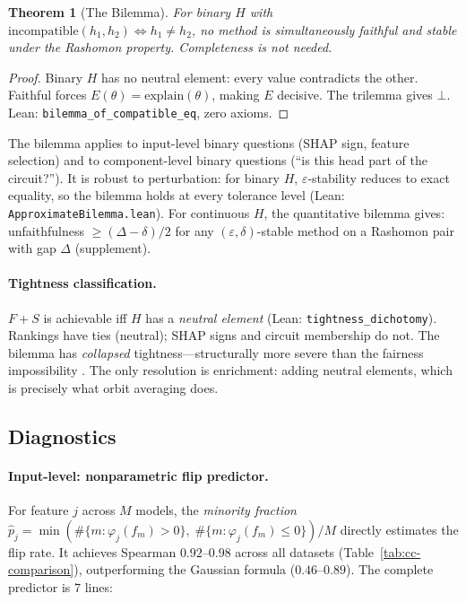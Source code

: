 \documentclass{article}
\newtheorem{theorem}{Theorem}
\begin{document}
\begin{theorem}[The Bilemma]
\label{thm:bilemma}
For binary $H$ with $\mathrm{incompatible}(h_1, h_2) \Leftrightarrow h_1 \neq h_2$, no method is simultaneously faithful and stable under the Rashomon property. Completeness is not needed.
\end{theorem}
\begin{proof}
Binary $H$ has no neutral element: every value contradicts the other. Faithful forces $E(\theta) = \mathrm{explain}(\theta)$, making $E$ decisive. The trilemma gives $\bot$. \hfill Lean: \texttt{bilemma\_of\_compatible\_eq}, zero axioms.
\end{proof}

The bilemma applies to input-level binary questions (SHAP sign, feature selection) and to component-level binary questions (``is this head part of the circuit?''). It is robust to perturbation: for binary $H$, $\varepsilon$-stability reduces to exact equality, so the bilemma holds at every tolerance level (Lean: \texttt{ApproximateBilemma.lean}). For continuous $H$, the quantitative bilemma gives: unfaithfulness $\geq (\Delta - \delta)/2$ for any $(\varepsilon,\delta)$-stable method on a Rashomon pair with gap $\Delta$ (supplement).

\paragraph{Tightness classification.}
$F{+}S$ is achievable iff $H$ has a \emph{neutral element} (Lean: \texttt{tightness\_dichotomy}). Rankings have ties (neutral); SHAP signs and circuit membership do not. The bilemma has \emph{collapsed} tightness---structurally more severe than the fairness impossibility \citep{chouldechova2017fair}. The only resolution is enrichment: adding neutral elements, which is precisely what orbit averaging does.

\subsection{Diagnostics}

\paragraph{Input-level: nonparametric flip predictor.}
For feature $j$ across $M$ models, the \emph{minority fraction}
$\hat{p}_j = \min(\#\{m : \varphi_j(f_m) > 0\},\; \#\{m : \varphi_j(f_m) \leq 0\}) / M$
directly estimates the flip rate. It achieves Spearman $0.92$--$0.98$ across all datasets (Table~\ref{tab:cc-comparison}), outperforming the Gaussian formula ($0.46$--$0.89$). The complete predictor is 7 lines:
\end{document}
